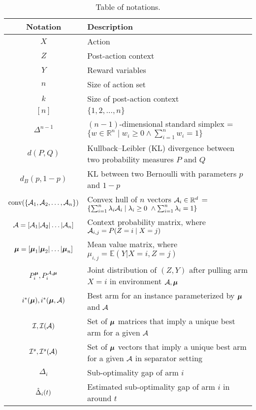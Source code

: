 \begin{table}[H]
    \centering
    \caption{Table of notations.}
    \label{table: notations}
    \begin{tabular}{c|l} 
        \toprule
        Notation & Description \\
        \hline
        $X$ & Action \\
        $Z$ & Post-action context \\
        $Y$ & Reward variables \\
        $n$ & Size of action set \\
        $k$ & Size of post-action context \\
        $[n]$ & $\{1, 2, \dots, n\}$ \\
        $\Delta^{n-1}$ & $(n-1)$-dimensional standard simplex = $\{w \in \mathbb{R}^n \mid w_i \geq 0 \wedge \sum_{i = 1}^{n} w_i = 1\}$ \\
        $d(P, Q)$ & Kullback–Leibler (KL) divergence between two probability measures $P$ and $Q$ \\
        $d_{B}(p, 1-p)$ & KL between two Bernoulli  with parameters $p$ and $1 - p$ \\
        $\text{conv}(\{\mathcal{A}_1, \mathcal{A}_2, \dots, \mathcal{A}_n\})$ & Convex hull of \(n\) vectors \(\mathcal{A}_i \in \mathbb{R}^d\) = $ \left\{ \sum_{i = 1 }^{n} \lambda_i \mathcal{A}_i \mid \lambda_i \geq 0 \ \wedge \sum_{i = 1}^{n} \lambda_i = 1 \right\}$ \\
        $\mathcal{A} = [\mathcal{A}_1 \vert \mathcal{A}_2 \vert \ldots \vert \mathcal{A}_n]$ & Context probability matrix, where $\mathcal{A}_{i,j} = P(Z = i \mid X = j)$ \\
        $\boldsymbol{\mu} = [\boldsymbol{\mu}_1 \vert \boldsymbol{\mu}_2 \vert \ldots \vert \boldsymbol{\mu}_n]$ & Mean value matrix, where $\mu_{i,j} = \mathbb{E}(Y | X=i, Z=j)$ \\
        $P^{\boldsymbol{\mu}}_{i}, P^{\mathcal{A}, \boldsymbol{\mu}}_{i}$ & Joint distribution of $(Z, Y)$ after pulling arm $X = i$ in environment $\mathcal{A}, \boldsymbol{\mu}$ \\
        $i^*(\boldsymbol{\mu}), i^*(\boldsymbol{\mu}, \mathcal{A})$ & Best arm for an instance parameterized by $\boldsymbol{\mu}$ and $\mathcal{A}$ \\
        $\mathcal{I}, \mathcal{I}(\mathcal{A})$ &  Set of $\boldsymbol{\mu}$ matrices that imply a unique best arm for a given $\mathcal{A}$ \\
        $\mathcal{I}^s, \mathcal{I}^s(\mathcal{A})$ & Set of $\boldsymbol{\mu}$ vectors that imply a unique best arm for a given $\mathcal{A}$ in separator setting  \\  
        $\Delta_i$  &   Sub-optimality gap of arm $i$ \\
        $\hat{\Delta}_{i}(t)$ &  Estimated sub-optimality gap of arm $i$ in around $t$ \\

\end{tabular}
\end{table}
